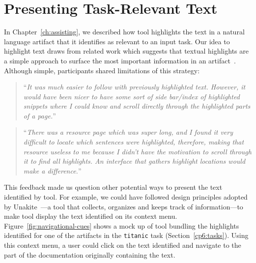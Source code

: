 




\section{Presenting Task-Relevant Text}
\label{cp7:info-viz}




In Chapter~\ref{ch:assisting}, we described how \acs{tool}
highlights the text in a natural language artifact that it identifies 
as relevant to an input task. Our idea to highlight text 
draws from related work which suggests that textual highlights 
are a simple approach to surface the most important information in 
an artifact~\cite{Robillard2015,nadi2020}. 
Although simple, participants shared limitations of 
this strategy:



\smallskip
\begin{footnotesize}
\begin{quote}
``\textit{It was much easier to follow with previously highlighted text.  
    However, it would have been nicer to have some sort of side bar/index of highlighted snippets
    where I could know and scroll directly through the highlighted parts of a page.}''
\end{quote}
\end{footnotesize}



\smallskip
\begin{footnotesize}
\begin{quote}
``\textit{There was a resource page which was super long, and I found it very difficult to locate which sentences were highlighted, therefore, making that resource useless to me because I didn't have the motivation to scroll through it to find all highlights. An interface that gathers highlight locations would make a difference.}''
\end{quote}
\end{footnotesize}


\smallskip
This feedback made us question other potential ways to present the text identified by \acs{tool}.
For example, we could have followed design principles adopted by Unakite~\cite{Liu2018Unakite}---a tool that collects, organizes and keeps track of information---to make \acs{tool} display the text identified on its context menu.
Figure~\ref{fig:navigational-cues} shows a mock up of \acs{tool} bundling the highlights identified for one of the artifacts in the \texttt{titanic} task (Section~\ref{cp6:tasks}).
Using this context menu, a user could click on the text identified and navigate to the part of the documentation 
originally containing the text.



